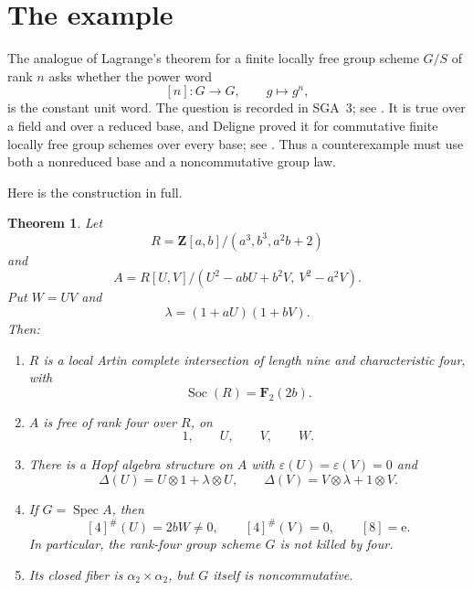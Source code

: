 \documentclass[11pt]{amsart}
\newtheorem{theorem}{Theorem}[section]
\theoremstyle{definition}
\theoremstyle{remark}
\newcommand{\Z}{\mathbf Z}
\newcommand{\F}{\mathbf F}
\newcommand{\Spec}{\operatorname{Spec}}
\newcommand{\Soc}{\operatorname{Soc}}
\newcommand{\eps}{\varepsilon}
\newcommand{\ot}{\otimes}
\newcommand{\unit}{\mathrm e}
\begin{document}
\section{The example}

The analogue of Lagrange's theorem for a finite locally free group scheme
\(G/S\) of rank \(n\) asks whether the power word
\[
 [n]\colon G\longrightarrow G,\qquad g\longmapsto g^n,
\]
is the constant unit word.  The question is recorded in SGA~3; see
\cite[Exp.~VIII, Rem.~7.3.1]{SGA3II}.  It is true over a field and over a
reduced base, and Deligne proved it for commutative finite locally free
group schemes over every base; see \cite[\S1]{OortTate}.  Thus a
counterexample must use both a nonreduced base and a noncommutative group
law.

Here is the construction in full.

\begin{theorem}\label{thm:main}
Let
\begin{equation}\label{eq:R}
 R=\Z[a,b]/(a^3,b^3,a^2b+2)
\end{equation}
and
\begin{equation}\label{eq:A}
 A=R[U,V]/(U^2-abU+b^2V,\ V^2-a^2V).
\end{equation}
Put \(W=UV\) and
\begin{equation}\label{eq:lambda}
 \lambda=(1+aU)(1+bV).
\end{equation}
Then:
\begin{enumerate}
\item \(R\) is a local Artin complete intersection of length nine and
characteristic four, with
\[
 \Soc(R)=\F_2(2b).
\]
\item \(A\) is free of rank four over \(R\), on
\[
 1,\qquad U,\qquad V,\qquad W.
\]
\item There is a Hopf algebra structure on \(A\) with
\(\eps(U)=\eps(V)=0\) and
\begin{equation}\label{eq:Delta}
 \Delta(U)=U\ot1+\lambda\ot U,\qquad
 \Delta(V)=V\ot\lambda+1\ot V.
\end{equation}
\item If \(G=\Spec A\), then
\begin{equation}\label{eq:powers}
 [4]^\#(U)=2bW\ne0,\qquad
 [4]^\#(V)=0,\qquad
 [8]=\unit.
\end{equation}
In particular, the rank-four group scheme \(G\) is not killed by four.
\item Its closed fiber is \(\alpha _2\times\alpha _2\), but \(G\) itself
is noncommutative.
\end{enumerate}
\end{theorem}
\end{document}
